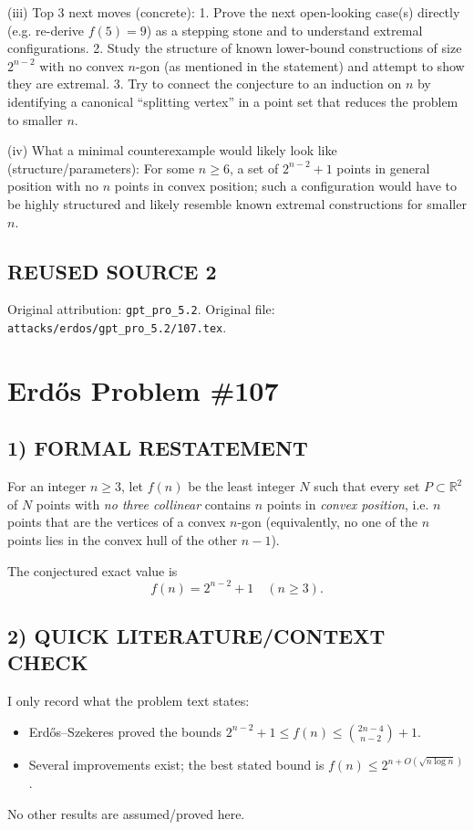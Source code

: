 (iii) Top 3 next moves (concrete):
1. Prove the next open-looking case(s) directly (e.g. re-derive $f(5)=9$) as a stepping stone and to understand extremal configurations.
2. Study the structure of known lower-bound constructions of size $2^{n-2}$ with no convex $n$-gon (as mentioned in the statement) and attempt to show they are extremal.
3. Try to connect the conjecture to an induction on $n$ by identifying a canonical ``splitting vertex'' in a point set that reduces the problem to smaller $n$.

(iv) What a minimal counterexample would likely look like (structure/parameters):
For some $n\ge 6$, a set of $2^{n-2}+1$ points in general position with no $n$ points in convex position; such a configuration would have to be highly structured and likely resemble known extremal constructions for smaller $n$.


\subsection*{REUSED SOURCE 2}
Original attribution: \texttt{gpt\_pro\_5.2}.
Original file: \texttt{attacks/erdos/gpt\_pro\_5.2/107.tex}.


\section*{Erd\H{o}s Problem \#107}

\subsection*{1) FORMAL RESTATEMENT}
For an integer $n\ge3$, let $f(n)$ be the least integer $N$ such that every set $P\subset\mathbb R^2$ of $N$ points with \emph{no three collinear} contains $n$ points in \emph{convex position}, i.e. $n$ points that are the vertices of a convex $n$-gon (equivalently, no one of the $n$ points lies in the convex hull of the other $n-1$).

The conjectured exact value is
\[
 f(n)=2^{n-2}+1\quad(n\ge3).
\]

\subsection*{2) QUICK LITERATURE/CONTEXT CHECK}
I only record what the problem text states:
\begin{itemize}
\item Erd\H{o}s--Szekeres proved the bounds $2^{n-2}+1\le f(n)\le \binom{2n-4}{n-2}+1$.
\item Several improvements exist; the best stated bound is $f(n)\le 2^{n+O(\sqrt{n\log n})}$.
\end{itemize}
No other results are assumed/proved here.

